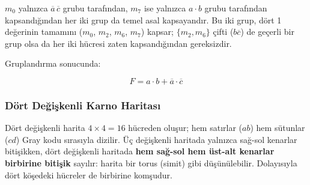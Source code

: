 \begin{ornek}[B.5]
$m_0$ yalnızca $\overline{a}\,\overline{c}$ grubu tarafından, $m_7$ ise yalnızca $a \cdot b$ grubu tarafından kapsandığından her iki grup da temel asal kapsayandır. Bu iki grup, dört 1 değerinin tamamını ($m_0$, $m_2$, $m_6$, $m_7$) kapsar; $\{m_2, m_6\}$ çifti ($b\overline{c}$) de geçerli bir grup olsa da her iki hücresi zaten kapsandığından gereksizdir.

Gruplandırma sonucunda:

\[
    F = a \cdot b + \overline{a} \cdot \overline{c}
\]
\end{ornek}

\subsubsection{Dört Değişkenli Karno Haritası}

Dört değişkenli harita $4 \times 4 = 16$ hücreden oluşur; hem satırlar ($ab$) hem sütunlar ($cd$) Gray kodu sırasıyla dizilir. Üç değişkenli haritada yalnızca sağ-sol kenarlar bitişikken, dört değişkenli haritada \textbf{hem sağ-sol hem üst-alt kenarlar birbirine bitişik} sayılır: harita bir torus (simit) gibi düşünülebilir. Dolayısıyla dört köşedeki hücreler de birbirine komşudur.

